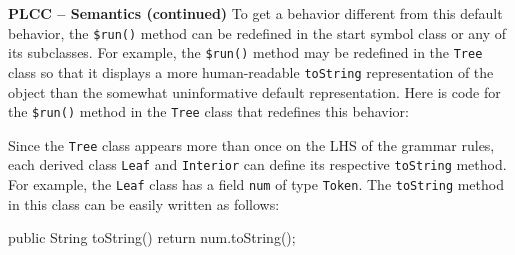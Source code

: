 \begin{minipage}[t]{\sw}
\slidenumber
\LARGE
{\bf PLCC -- Semantics (continued)}\exx
To get a behavior different from this default behavior,
the \verb'$run()' method can be redefined
in the start symbol class or any of its subclasses.
For example, the \verb'$run()' method may be redefined
in the \verb'Tree' class so that
it displays a more human-readable \verb'toString' representation of the object
than the somewhat uninformative default representation.
Here is code for the \verb'$run()' method in the \verb'Tree' class
that redefines this behavior:
{\Large
{}
}
Since the \verb'Tree' class appears more than once on the LHS of the grammar rules,
each derived class \verb'Leaf' and \verb'Interior' can define
its respective \verb'toString' method.\exx
For example, the \verb'Leaf' class has a field \verb'num'
of type \verb'Token'.
The \verb'toString' method in this class can be easily written as follows:
{\Large
\begin{qv}
public String toString() {
    return num.toString();
}
\end{qv}
}
\end{minipage}
\clearpage
